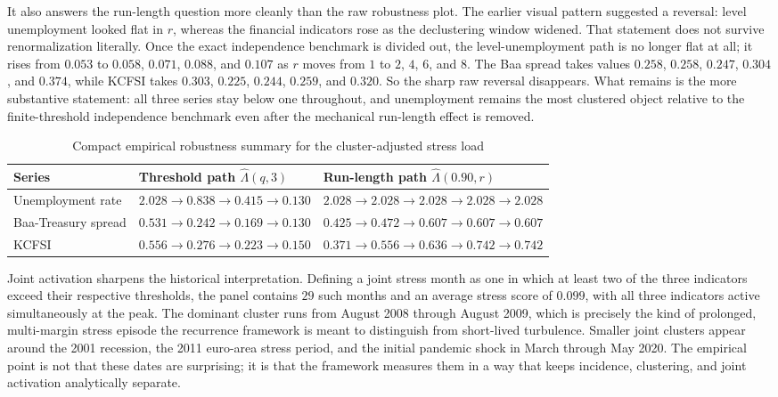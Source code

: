 \documentclass[11pt]{article}
\begin{document}
It also answers the run-length question more cleanly than the raw robustness plot. The earlier visual pattern suggested a reversal: level unemployment looked flat in $r$, whereas the financial indicators rose as the declustering window widened. That statement does not survive renormalization literally. Once the exact independence benchmark is divided out, the level-unemployment path is no longer flat at all; it rises from $0.053$ to $0.058$, $0.071$, $0.088$, and $0.107$ as $r$ moves from $1$ to $2$, $4$, $6$, and $8$. The Baa spread takes values $0.258$, $0.258$, $0.247$, $0.304$, and $0.374$, while KCFSI takes $0.303$, $0.225$, $0.244$, $0.259$, and $0.320$. So the sharp raw reversal disappears. What remains is the more substantive statement: all three series stay below one throughout, and unemployment remains the most clustered object relative to the finite-threshold independence benchmark even after the mechanical run-length effect is removed.

\begin{table}[H]
\centering
\caption{Compact empirical robustness summary for the cluster-adjusted stress load}
\label{tab:empirical_robustness_summary}
\small
\begin{tabular}{>{\raggedright\arraybackslash}p{} >{\raggedright\arraybackslash}p{} >{\raggedright\arraybackslash}p{}}
\toprule
Series & Threshold path $\widehat{\Lambda}(q,3)$ & Run-length path $\widehat{\Lambda}(0.90,r)$ \\
\midrule
Unemployment rate & $2.028 \rightarrow 0.838 \rightarrow 0.415 \rightarrow 0.130$ & $2.028 \rightarrow 2.028 \rightarrow 2.028 \rightarrow 2.028 \rightarrow 2.028$ \\
Baa-Treasury spread & $0.531 \rightarrow 0.242 \rightarrow 0.169 \rightarrow 0.130$ & $0.425 \rightarrow 0.472 \rightarrow 0.607 \rightarrow 0.607 \rightarrow 0.607$ \\
KCFSI & $0.556 \rightarrow 0.276 \rightarrow 0.223 \rightarrow 0.150$ & $0.371 \rightarrow 0.556 \rightarrow 0.636 \rightarrow 0.742 \rightarrow 0.742$ \\
\bottomrule
\end{tabular}
\normalsize
\end{table}

Joint activation sharpens the historical interpretation. Defining a joint stress month as one in which at least two of the three indicators exceed their respective thresholds, the panel contains $29$ such months and an average stress score of $0.099$, with all three indicators active simultaneously at the peak. The dominant cluster runs from August 2008 through August 2009, which is precisely the kind of prolonged, multi-margin stress episode the recurrence framework is meant to distinguish from short-lived turbulence. Smaller joint clusters appear around the 2001 recession, the 2011 euro-area stress period, and the initial pandemic shock in March through May 2020. The empirical point is not that these dates are surprising; it is that the framework measures them in a way that keeps incidence, clustering, and joint activation analytically separate.
\end{document}
